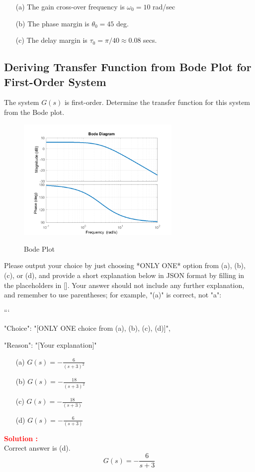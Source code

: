 \documentclass[12pt]{article}
\begin{document}
\begin{itemize}
    \item [(a)] The gain cross-over frequency is $\omega_0 = 10$ rad/sec
    \item [(b)] The phase margin is $\theta_0 = 45 $ deg.
    \item [(c)] The delay margin is $\tau_0 = \pi/ 40 \approx 0.08$ secs.
\end{itemize}
\clearpage

\subsection{Deriving Transfer Function from Bode Plot for First-Order System}

The system \(G(s)\) is first-order. Determine the transfer function for this system from the Bode plot.
\begin{figure}[H]
    \centering
    \includegraphics[width=0.7\textwidth]{figs/6.5.png}
    \label{fig:89}
    \caption{Bode Plot}
\end{figure}
Please output your choice by just choosing *ONLY ONE* option from (a), (b), (c), or (d), and provide a short explanation below in JSON format by filling in the placeholders in []. Your answer should not include any further explanation, and remember to use parentheses; for example, "(a)" is correct, not "a":

```
{

"Choice": "[ONLY ONE choice from (a), (b), (c), (d)]",

"Reason": "[Your explanation]"

}

\begin{itemize}
    \item[(a)] \(G(s) = -\frac{6}{(s+3)^2}\)
    \item[(b)] \(G(s) = -\frac{18}{(s+3)^2}\)
    \item[(c)] \(G(s) = -\frac{18}{(s+3)}\)
    \item[(d)] \(G(s) = -\frac{6}{(s+3)}\)
\end{itemize}
\textbf{\textcolor{red}{Solution :}}\\
Correct answer is (d).\\
\[G(s) = - \frac{6}{s+3}\]
\clearpage
\end{document}
